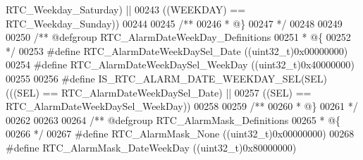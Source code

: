 \begin{DoxyCode}
      RTC_Weekday_Saturday\textcolor{preprocessor}{)} \textcolor{preprocessor}{||}
00243                                                     \textcolor{preprocessor}{(}\textcolor{preprocessor}{(}\textcolor{preprocessor}{WEEKDAY}\textcolor{preprocessor}{)} \textcolor{preprocessor}{==} 
      RTC_Weekday_Sunday\textcolor{preprocessor}{)}\textcolor{preprocessor}{)}
00244 
00245 \textcolor{comment}{/**}
00246 \textcolor{comment}{  * @\}}
00247 \textcolor{comment}{  */}
00248 
00249 
00250 \textcolor{comment}{/** @defgroup RTC\_AlarmDateWeekDay\_Definitions }
00251 \textcolor{comment}{  * @\{}
00252 \textcolor{comment}{  */}
00253 \textcolor{preprocessor}{#}\textcolor{preprocessor}{define} \textcolor{preprocessor}{RTC\_AlarmDateWeekDaySel\_Date}      \textcolor{preprocessor}{(}\textcolor{preprocessor}{(}\textcolor{preprocessor}{uint32\_t}\textcolor{preprocessor}{)}0x00000000\textcolor{preprocessor}{)}
00254 \textcolor{preprocessor}{#}\textcolor{preprocessor}{define} \textcolor{preprocessor}{RTC\_AlarmDateWeekDaySel\_WeekDay}   \textcolor{preprocessor}{(}\textcolor{preprocessor}{(}\textcolor{preprocessor}{uint32\_t}\textcolor{preprocessor}{)}0x40000000\textcolor{preprocessor}{)}
00255 
00256 \textcolor{preprocessor}{#}\textcolor{preprocessor}{define} \textcolor{preprocessor}{IS\_RTC\_ALARM\_DATE\_WEEKDAY\_SEL}\textcolor{preprocessor}{(}\textcolor{preprocessor}{SEL}\textcolor{preprocessor}{)} \textcolor{preprocessor}{(}\textcolor{preprocessor}{(}\textcolor{preprocessor}{(}\textcolor{preprocessor}{SEL}\textcolor{preprocessor}{)} \textcolor{preprocessor}{==} 
      RTC_AlarmDateWeekDaySel_Date\textcolor{preprocessor}{)} \textcolor{preprocessor}{||}
00257                                             \textcolor{preprocessor}{(}\textcolor{preprocessor}{(}\textcolor{preprocessor}{SEL}\textcolor{preprocessor}{)} \textcolor{preprocessor}{==} 
      RTC_AlarmDateWeekDaySel_WeekDay\textcolor{preprocessor}{)}\textcolor{preprocessor}{)}
00258 
00259 \textcolor{comment}{/**}
00260 \textcolor{comment}{  * @\}}
00261 \textcolor{comment}{  */}
00262 
00263 
00264 \textcolor{comment}{/** @defgroup RTC\_AlarmMask\_Definitions }
00265 \textcolor{comment}{  * @\{}
00266 \textcolor{comment}{  */}
00267 \textcolor{preprocessor}{#}\textcolor{preprocessor}{define} \textcolor{preprocessor}{RTC\_AlarmMask\_None}                \textcolor{preprocessor}{(}\textcolor{preprocessor}{(}\textcolor{preprocessor}{uint32\_t}\textcolor{preprocessor}{)}0x00000000\textcolor{preprocessor}{)}
00268 \textcolor{preprocessor}{#}\textcolor{preprocessor}{define} \textcolor{preprocessor}{RTC\_AlarmMask\_DateWeekDay}         \textcolor{preprocessor}{(}\textcolor{preprocessor}{(}\textcolor{preprocessor}{uint32\_t}\textcolor{preprocessor}{)}0x80000000\textcolor{preprocessor}{)}

\end{DoxyCode}

